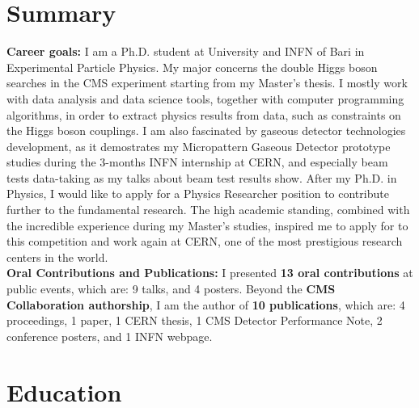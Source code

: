 \documentclass[11pt]{res}
\newcommand{\MarginText}[1]{\section{#1}\vspace{10pt}}
\begin{document}
\newcommand{\DOI}[1]{\href{https://doi.org/#1}{doi:#1}}
\begin{resume}
\MarginText{Summary}

\textbf{Career goals:} I am a Ph.D. student at University and INFN of Bari in Experimental Particle Physics. My major concerns the double Higgs boson searches in the CMS experiment starting from my Master's thesis. I mostly work with data analysis and data science tools, together with computer programming algorithms, in order to extract physics results from data, such as constraints on the Higgs boson couplings. I am also fascinated by gaseous detector technologies development, as it demostrates my Micropattern Gaseous Detector prototype studies during the 3-months INFN internship at CERN, and especially beam tests data-taking as my talks about beam test results show. After my Ph.D. in Physics, I would like to apply for a Physics Researcher position to contribute further to the fundamental research. The high academic standing, combined with the incredible experience during my Master's studies, inspired me to apply for to this competition and work again at CERN, one of the most prestigious research centers in the world.\\

\textbf{Oral Contributions and Publications:} I presented \textbf{13 oral contributions} at public events, which are: 9 talks, and 4 posters. Beyond the \textbf{CMS Collaboration authorship}, I am the author of \textbf{10 publications}, which are: 4 proceedings, 1 paper, 1 CERN thesis, 1 CMS Detector Performance Note, 2 conference posters, and 1 INFN webpage.\\

\MarginText{Education}


\end{resume}
\end{document}
